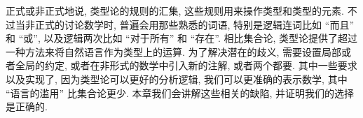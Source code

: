 正式或非正式地说, 类型论的规则的汇集, 这些规则用来操作类型和类型的元素.
不过当非正式的讨论数学时, 普遍会用那些熟悉的词语, 特别是逻辑连词比如 ``而且'' 和 ``或'', 以及逻辑两次比如 ``对于所有'' 和 ``存在''.
相比集合论, 类型论提供了超过一种方法来将自然语言作为类型上的运算.
为了解决潜在的歧义, 需要设置局部或者全局的约定, 或者在非形式的数学中引入新的注解, 或者两个都要.
其中一些要求以及实现了, 因为类型论可以更好的分析逻辑, 我们可以更准确的表示数学, 其中 ``语言的滥用'' 比集合论更少.
本章我们会讲解这些相关的缺陷, 并证明我们的选择是正确的.
